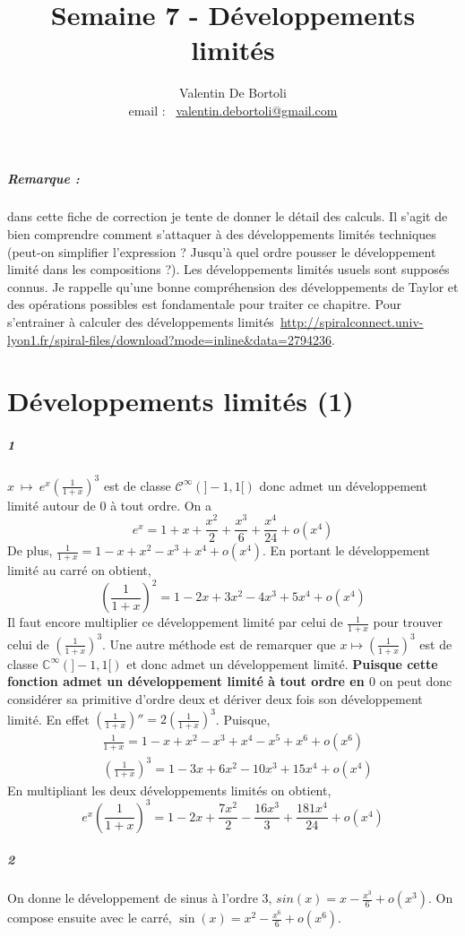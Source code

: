 \documentclass[10pt,a4paper]{article}
\title{Semaine 7 - Développements limités}
\author{Valentin De Bortoli \\ email : \ \href{mailto:valentin.debortoli@gmail.com}{valentin.debortoli@gmail.com}}
\date{}
\newcommand{\al}[1]{\begin{aligned} #1 \end{aligned}}
\begin{document}
\maketitle
\subparagraph{Remarque :} dans cette fiche de correction je tente de donner le détail des calculs. Il s'agit de bien comprendre comment s'attaquer à des développements limités techniques (peut-on simplifier l'expression ? Jusqu'à quel ordre pousser le développement limité dans les compositions ?). Les développements limités usuels sont supposés connus. Je rappelle qu'une bonne compréhension des développements de Taylor et des opérations possibles est fondamentale pour traiter ce chapitre. Pour s'entrainer à calculer des développements limités~\url{http://spiralconnect.univ-lyon1.fr/spiral-files/download?mode=inline&data=2794236}.

\section{Développements limités (1)}
\subparagraph{1} $x \ \mapsto \ e^x\left(\frac{1}{1+x} \right)^3$ est de classe $\mathcal{C}^{\infty}(]-1,1[)$ donc admet un développement limité autour de $0$ à tout ordre. On a 
\[e^x = 1+ x + \frac{x^2}{2}+ \frac{x^3}{6} + \frac{x^4}{24} + o(x^4)\]
De plus, $\frac{1}{1+x}  = 1 -x + x^2 -x^3 +x^4 + o(x^4)$. En portant le développement limité au carré on obtient,
\[
\left(\frac{1}{1+x} \right)^2 = 1-2x+3x^2-4x^3+5x^4+o(x^4)
\]
Il faut encore multiplier ce développement limité par celui de $\frac{1}{1+x}$ pour trouver celui de $\left( \frac{1}{1+x} \right)^3$. Une autre méthode est de remarquer que $x \mapsto \left( \frac{1}{1+x} \right)^3$ est de classe $\mathbb{C}^{\infty}(]-1,1[)$ et donc admet un développement limité. \textbf{Puisque cette fonction admet un développement limité à tout ordre en $0$} on peut donc considérer sa primitive d'ordre deux et dériver deux fois son développement limité. En effet $\left( \frac{1}{1+x}\right)'' = 2\left(\frac{1}{1+x}\right)^3$. Puisque,
\[
\al{&\frac{1}{1+x} = 1-x+x^2-x^3+x^4-x^5+x^6+o(x^6) \\
&\left( \frac{1}{1+x} \right)^3 = 1 -3x +6x^2 -10x^3 + 15x^4 + o(x^4)}
\]
En multipliant les deux développements limités on obtient,
\[
e^x \left( \frac{1}{1+x} \right)^3 = 1 - 2x + \frac{7x^2}{2} - \frac{16x^3}{3} + \frac{181x^4}{24} + o(x^4)
\]

\subparagraph{2}
On donne le développement de sinus à l'ordre $3$, $sin(x) = x - \frac{x^3}{6} + o(x^3)$. On compose ensuite avec le carré, $\sin(x) = x^2 - \frac{x^6}{6} + o(x^6)$.
\end{document}
